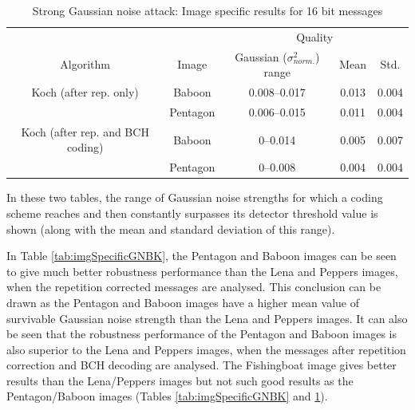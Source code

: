 \documentclass[12pt]{report}
\begin{document}
\normalsize
\begin{table}[htb]
\begin{scriptsize}
        \begin{center}
                \begin{tabular}{|c|c|c|c|c|} \hline
					& 		& \multicolumn{3}{c|}{Quality}	\\ \cline{3-5}
                Algorithm       	& Image         & Gaussian ($\sigma_{norm.}^{2}$) range    	& Mean     & Std. \\ \hline\hline
                Koch (after rep. only)  & Baboon        & 0.008--0.017                 			& 0.013            &0.004  \\ \cline{2-5}
                			& Pentagon 	& 0.006--0.015                 			& 0.011            &0.004   \\ \hline\hline

                Koch (after rep. and BCH coding)  & Baboon        & 0--0.014                  & 0.005            &0.007   \\ \cline{2-5}
                				  & Pentagon     & 0--0.008                   & 0.004            &0.004  \\ \hline
        \end{tabular}
        \caption{Strong Gaussian noise attack: Image specific results for 16 bit messages}
        \label{tab:imgSpecificGNStrongBK}
        \end{center}
\end{scriptsize}
\end{table}
\normalsize
In these two tables, the range of Gaussian noise strengths for which a coding scheme
reaches and then constantly surpasses its detector threshold value is shown (along with the mean and standard deviation of
this range). 

In Table \ref{tab:imgSpecificGNBK}, the Pentagon and Baboon images can be seen to give much better robustness performance 
than the Lena and Peppers images, when the repetition corrected messages are analysed. 
This conclusion can be drawn as the Pentagon and Baboon images have a higher mean value 
of survivable Gaussian noise strength than the Lena and Peppers images.
It can also be seen that the robustness performance of the Pentagon and Baboon images is also superior to the 
Lena and Peppers images, when the messages after repetition correction and BCH decoding are analysed. 
The Fishingboat image gives better results than the Lena/Peppers images but not such good results
as the Pentagon/Baboon images (Tables \ref{tab:imgSpecificGNBK} and \ref{tab:imgSpecificGNStrongBK}).
\end{document}
